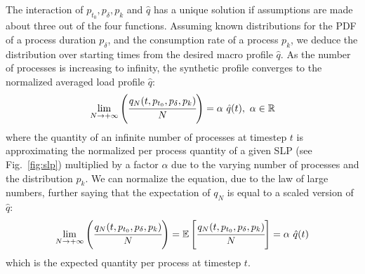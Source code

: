 \documentclass[conference]{IEEEtran}
\begin{document}
The interaction of $p_{t_0}, p_{\delta}, p_k$ and $\hat q$ has a unique solution if assumptions are made about three out of the four functions.
Assuming known distributions for the PDF of a process duration $p_{\delta}$, and the consumption rate of a process $p_k$, we deduce the distribution over starting times from the desired macro profile $\hat q$. As the number of processes is increasing to infinity, the synthetic profile converges to the normalized averaged load profile $\hat{q}$:
\begin{equation}\label{eq:approximation_n}
\lim_{N \rightarrow + \infty} \left( \cfrac{q_N(t, p_{t_0}, p_{\delta}, p_k)}{N} \right) = \alpha~\hat{q}(t),~\alpha \in \mathbb{R}
\end{equation}
where the quantity of an infinite number of processes at timestep $t$ is approximating the normalized per process quantity of a given SLP (see Fig.~\ref{fig:slp}) multiplied by a factor $\alpha$ due to the varying number of processes and the distribution $p_k$. We can normalize the equation, due to the law of large numbers, further saying that the expectation of $q_N$ is equal to a scaled version of $\hat{q}$: 
\begin{equation}\label{eq:approximation_1}
\lim_{N \rightarrow + \infty} \left( \cfrac{q_N(t, p_{t_0}, p_{\delta}, p_k)}{N} \right) = \mathbb{E}\left[ \cfrac{q_N(t, p_{t_0}, p_{\delta}, p_k)}{N} \right] = \alpha~\hat{q}(t)
\end{equation}
which is the expected quantity per process at timestep $t$.
\end{document}
